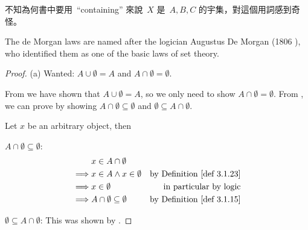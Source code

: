 \begin{note}
不知為何書中要用\ ``containing'' 來說\ \(X\) 是\ \(A, B, C\) 的宇集，對這個用詞感到奇怪。
\end{note}

\begin{remark}\label{remark 3.1.29}
The de Morgan laws are named after the logician Augustus De Morgan (1806 ), who identified them as one of the basic laws of set theory.
\end{remark}

\begin{proof}{(a)} Wanted: \(A \cup \emptyset = A\) and \(A \cap \emptyset = \emptyset\).

From  we have shown that \(A \cup \emptyset = A\), so we only need to show \(A \cap \emptyset = \emptyset\). From , we can prove by showing \(A \cap \emptyset \subseteq \emptyset\) and \(\emptyset \subseteq A \cap \emptyset\).

Let \(x\) be an arbitrary object, then

\(A \cap \emptyset \subseteq \emptyset\): 
\begin{align*}
         & x \in A \cap \emptyset \\
    \implies & x \in A \land x \in \emptyset & \text{by \DEF{3.1.23}} \\
    \implies & x \in \emptyset & \text{in particular by logic} \\
    \implies & A \cap \emptyset \subseteq \emptyset & \text{by \DEF{3.1.15}}
\end{align*}

\(\emptyset \subseteq A \cap \emptyset\): This was shown by .
\end{proof}

